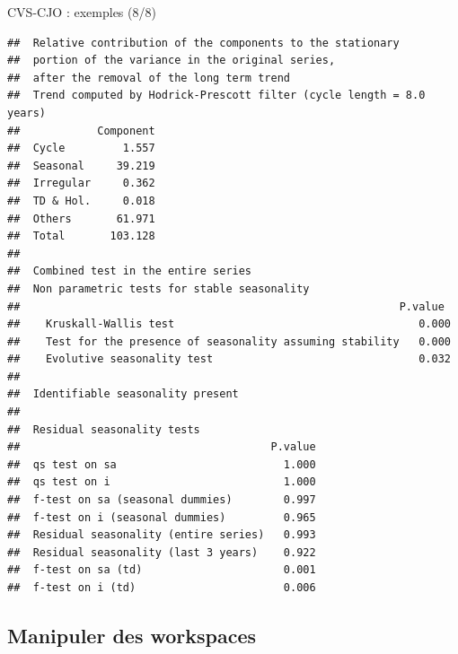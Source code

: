 \documentclass[10pt,xcolor=table,color={dvipsnames,usenames},ignorenonframetext,usepdftitle=false,french]{beamer}
\newenvironment{Shaded}{\begin{snugshade}}{\end{snugshade}}
\newcommand{\NormalTok}[1]{#1}
\newcommand{\OperatorTok}[1]{\textcolor[rgb]{0.81,0.36,0.00}{\textbf{#1}}}
\begin{document}
\begin{frame}[fragile]{CVS-CJO : exemples (8/8)}
\protect\hypertarget{cvs-cjo-exemples-88}{}

\footnotesize

\begin{Shaded}
\end{Shaded}

\begin{verbatim}
##  Relative contribution of the components to the stationary
##  portion of the variance in the original series,
##  after the removal of the long term trend 
##  Trend computed by Hodrick-Prescott filter (cycle length = 8.0 years)
##            Component
##  Cycle         1.557
##  Seasonal     39.219
##  Irregular     0.362
##  TD & Hol.     0.018
##  Others       61.971
##  Total       103.128
## 
##  Combined test in the entire series 
##  Non parametric tests for stable seasonality
##                                                           P.value
##    Kruskall-Wallis test                                      0.000
##    Test for the presence of seasonality assuming stability   0.000
##    Evolutive seasonality test                                0.032
##  
##  Identifiable seasonality present
## 
##  Residual seasonality tests 
##                                       P.value
##  qs test on sa                          1.000
##  qs test on i                           1.000
##  f-test on sa (seasonal dummies)        0.997
##  f-test on i (seasonal dummies)         0.965
##  Residual seasonality (entire series)   0.993
##  Residual seasonality (last 3 years)    0.922
##  f-test on sa (td)                      0.001
##  f-test on i (td)                       0.006
\end{verbatim}

\end{frame}

\hypertarget{manipuler-des-workspaces}{%
\subsection{Manipuler des workspaces}\label{manipuler-des-workspaces}}
\end{document}
